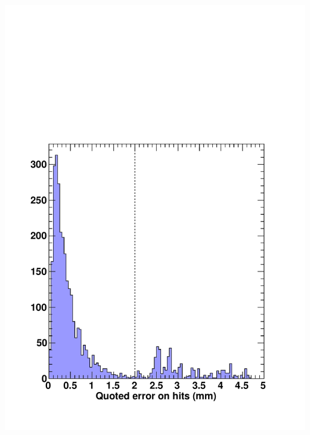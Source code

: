 \documentclass[compress]{beamer}
\begin{document}
\begin{frame}
\begin{columns}
\includegraphics[width=\linewidth]{REAL_hit_error.pdf}


\end{columns}
\end{frame}
\end{document}

